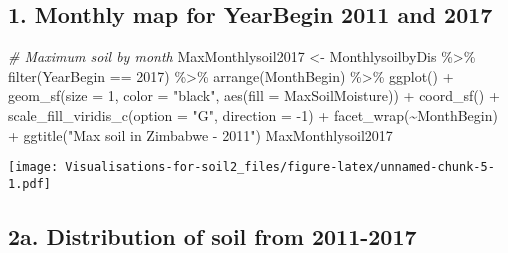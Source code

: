 \documentclass[
]{article}
\newenvironment{Shaded}{\begin{snugshade}}{\end{snugshade}}
\newcommand{\AttributeTok}[1]{\textcolor[rgb]{0.77,0.63,0.00}{#1}}
\newcommand{\CommentTok}[1]{\textcolor[rgb]{0.56,0.35,0.01}{\textit{#1}}}
\newcommand{\DecValTok}[1]{\textcolor[rgb]{0.00,0.00,0.81}{#1}}
\newcommand{\FunctionTok}[1]{\textcolor[rgb]{0.00,0.00,0.00}{#1}}
\newcommand{\NormalTok}[1]{#1}
\newcommand{\OtherTok}[1]{\textcolor[rgb]{0.56,0.35,0.01}{#1}}
\newcommand{\SpecialCharTok}[1]{\textcolor[rgb]{0.00,0.00,0.00}{#1}}
\newcommand{\StringTok}[1]{\textcolor[rgb]{0.31,0.60,0.02}{#1}}
\begin{document}
\hypertarget{monthly-map-for-yearbegin-2011-and-2017}{%
\subsection{1. Monthly map for YearBegin 2011 and
2017}\label{monthly-map-for-yearbegin-2011-and-2017}}

\begin{Shaded}
\begin{Highlighting}[]
\CommentTok{\# Maximum soil by month}
\NormalTok{MaxMonthlysoil2017 }\OtherTok{\textless{}{-}}\NormalTok{ MonthlysoilbyDis }\SpecialCharTok{\%\textgreater{}\%} 
  \FunctionTok{filter}\NormalTok{(YearBegin }\SpecialCharTok{==} \DecValTok{2017}\NormalTok{) }\SpecialCharTok{\%\textgreater{}\%} 
  \FunctionTok{arrange}\NormalTok{(MonthBegin) }\SpecialCharTok{\%\textgreater{}\%} 
  \FunctionTok{ggplot}\NormalTok{() }\SpecialCharTok{+}
  \FunctionTok{geom\_sf}\NormalTok{(}\AttributeTok{size =} \DecValTok{1}\NormalTok{, }\AttributeTok{color =} \StringTok{"black"}\NormalTok{, }\FunctionTok{aes}\NormalTok{(}\AttributeTok{fill =}\NormalTok{ MaxSoilMoisture)) }\SpecialCharTok{+}
  \FunctionTok{coord\_sf}\NormalTok{() }\SpecialCharTok{+}
  \FunctionTok{scale\_fill\_viridis\_c}\NormalTok{(}\AttributeTok{option =} \StringTok{"G"}\NormalTok{, }\AttributeTok{direction =} \SpecialCharTok{{-}}\DecValTok{1}\NormalTok{) }\SpecialCharTok{+}
  \FunctionTok{facet\_wrap}\NormalTok{(}\SpecialCharTok{\textasciitilde{}}\NormalTok{MonthBegin) }\SpecialCharTok{+}
  \FunctionTok{ggtitle}\NormalTok{(}\StringTok{"Max soil in Zimbabwe {-} 2011"}\NormalTok{)}
\NormalTok{MaxMonthlysoil2017}
\end{Highlighting}
\end{Shaded}

\texttt{[image: Visualisations-for-soil2\_files/figure-latex/unnamed-chunk-5-1.pdf]}

\hypertarget{a.-distribution-of-soil-from-2011-2017}{%
\subsection{2a. Distribution of soil from
2011-2017}\label{a.-distribution-of-soil-from-2011-2017}}
\end{document}
